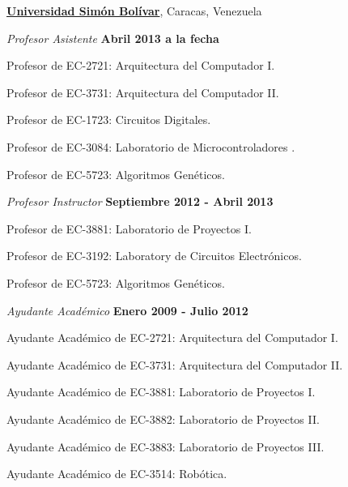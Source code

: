 \documentclass[10pt]{article}
\begin{document}
\href{http://www.usb.ve/}{\textbf{Universidad Simón Bolívar}}, Caracas, Venezuela
\begin{outerlist}

    \item[] \textit{Profesor Asistente}
        \hfill \textbf{Abril 2013 a la fecha}
        \begin{innerlist}
            \item Profesor de EC-2721: Arquitectura del Computador I.
            \item Profesor de EC-3731: Arquitectura del Computador II.
            \item Profesor de EC-1723: Circuitos Digitales.
            \item Profesor de EC-3084: Laboratorio de Microcontroladores .
            \item Profesor de EC-5723: Algoritmos Genéticos.
        \end{innerlist}

    \item[] \textit{Profesor Instructor}
        \hfill \textbf{Septiembre 2012 - Abril 2013}
        \begin{innerlist}
            \item Profesor de EC-3881: Laboratorio de Proyectos I.
            \item Profesor de EC-3192: Laboratory de Circuitos Electrónicos.
            \item Profesor de EC-5723: Algoritmos Genéticos.
        \end{innerlist}
    \item[] \textit{Ayudante Académico}
        \hfill \textbf{Enero 2009 - Julio 2012}
        \begin{innerlist}
            \item Ayudante Académico de EC-2721: Arquitectura del Computador I.
            \item Ayudante Académico de EC-3731: Arquitectura del Computador II.
            \item Ayudante Académico de EC-3881: Laboratorio de Proyectos I.
            \item Ayudante Académico de EC-3882: Laboratorio de Proyectos II.
            \item Ayudante Académico de EC-3883: Laboratorio de Proyectos III.
            \item Ayudante Académico de EC-3514: Robótica.
        \end{innerlist}
\end{outerlist}
\end{document}
